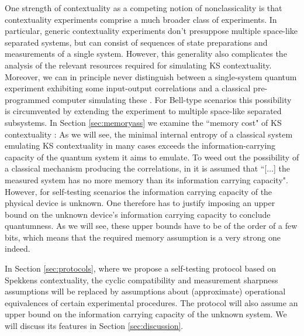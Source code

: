 One strength of contextuality as a competing notion of nonclassicality is that contextuality experiments comprise a much broader class of experiments. In particular, generic contextuality experiments don't presuppose multiple space-like separated systems, but can consist of sequences of state preparations and measurements of a single system. However, this generality also complicates the analysis of the relevant resources required for simulating KS contextuality. Moreover, we can in principle never distinguish between a single-system quantum experiment exhibiting some input-output correlations and a classical pre-programmed computer simulating these \cite{Supic2020}. For Bell-type scenarios this possibility is circumvented by extending the experiment to multiple space-like separated subsystems. In Section \ref{sec:memoryass} we examine the ``memory cost" of KS contextuality \cite{Cabello2018,Kleinmann2011}: As we will see, the minimal internal entropy of a classical system emulating KS contextuality in many cases exceeds the information-carrying capacity of the quantum system it aims to emulate. To weed out the possibility of a classical mechanism producing the correlations, in \cite{Bharti2019} it is assumed that ``[$\dots$] the measured system has no more memory than its information carrying capacity".
However, for self-testing scenarios the information carrying capacity of the physical device is unknown.
One therefore has to justify imposing an upper bound on the unknown device's information carrying capacity to conclude quantumness. As we will see, these upper bounds have to be of the order of a few bits, which means that the required memory assumption is a very strong one indeed. 

In Section \ref{sec:protocols}, where we propose a self-testing protocol based on Spekkens contextuality, the cyclic compatibility and measurement sharpness assumptions will be replaced by assumptions about (approximate) operational equivalences of certain experimental procedures. The protocol will also assume an upper bound on the information carrying capacity of the unknown system. We will discuss its features in Section \ref{sec:discussion}.

